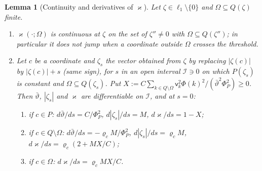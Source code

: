 \documentclass[10pt]{amsart}
\newtheorem{lemma}[theorem]{Lemma}
\theoremstyle{definition}
\theoremstyle{remark}
\begin{document}
\begin{lemma}[Continuity and derivatives of $\varkappa$]\label{lem:II-kappader}
Let $\zeta\in\ell_1\setminus\{0\}$ and $\Omega\subseteq Q(\zeta)$ finite.
\begin{enumerate}
\item[(a)] $\varkappa(\cdot;\Omega)$ is continuous at $\zeta$ on the set of
$\zeta''\ne0$ with $\Omega\subseteq Q(\zeta'')$; in particular it does not
jump when a coordinate outside $\Omega$ crosses the threshold.
\item[(b)] Let $c$ be a coordinate and $\zeta_s$ the vector obtained from
$\zeta$ by replacing $|\zeta(c)|$ by $|\zeta(c)|+s$ \textup{(}same sign\textup{)}, for
$s$ in an open interval $\mathcal I\ni0$ on which $P(\zeta_s)$ is constant
and $\Omega\subseteq Q(\zeta_s)$.  Put $X:=C\sum_{k\in Q\setminus\Omega}
\mathsf v_k^2\Phi(k)^2/(\bar\vartheta^2\Phi_P^2)\ge0$.  Then
$\bar\vartheta$, $|\zeta_s|$ and $\varkappa$ are differentiable on $\mathcal I$,
and at $s=0$:
\begin{enumerate}
\item[(i)] if $c\in P$: $d\bar\vartheta/ds=C/\Phi_P^2$, $d|\zeta_s|/ds=M$,
$d\varkappa/ds=1-X$;
\item[(ii)] if $c\in Q\setminus\Omega$: $d\bar\vartheta/ds=-\varrho_cM/\Phi_P^2$,
$d|\zeta_s|/ds=\varrho_cM$, $d\varkappa/ds=\varrho_c(2+MX/C)$;
\item[(iii)] if $c\in\Omega$: $d\varkappa/ds=\varrho_cMX/C$.
\end{enumerate}
\end{enumerate}
\end{lemma}
\end{document}
